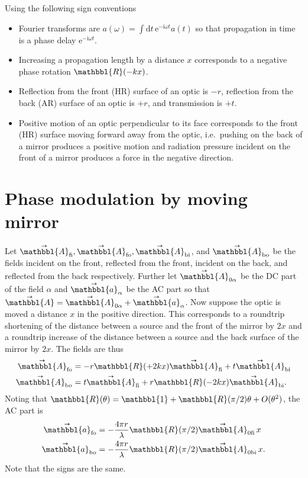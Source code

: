 \documentclass[
  reprint,
  12pt,
  onecolumn,
  nofootinbib,
]{revtex4-2}
\newcommand{\Tmat}[1]{\ensuremath{\mathbbl{#1}}}
\newcommand{\Tvec}[1]{\overset{\raisebox{-2pt}{\text{\tiny$\bm\rightarrow$}}}{\mathbbl{#1}}}
\newcommand{\rme}{\mathrm{e}}
\newcommand{\rmi}{\mathrm{i}}
\newcommand{\rmd}{\mathrm{d}}
\begin{document}
Using the following sign conventions
\begin{itemize}
\item Fourier transforms are
  $a(\omega) = \int \rmd t\, \rme^{-\rmi\omega t} a(t)$
  so that propagation in time is a phase delay $\rme^{-\rmi\omega t}$.
\item Increasing a propagation length by a distance $x$ corresponds to a negative phase rotation $\Tmat{R}(-kx)$.
\item Reflection from the front (HR) surface of an optic is $-r$, reflection from the back (AR) surface of an optic is $+r$, and transmission is $+t$.
\item Positive motion of an optic perpendicular to its face corresponds to the front (HR) surface moving forward away from the optic, i.e.\ pushing on the back of a mirror produces a positive motion and radiation pressure incident on the front of a mirror produces a force in the negative direction.
\end{itemize}

\section{Phase modulation by moving mirror}

Let $\Tvec{A}_{\text{fi}}, \Tvec{A}_{\text{fo}}, \Tvec{A}_{\text{bi}}$, and $\Tvec{A}_{\text{bo}}$ be the fields incident on the front, reflected from the front, incident on the back, and reflected from the back respectively. Further let $\Tvec{A}_{0\alpha}$ be the DC part of the field $\alpha$ and $\Tvec{a}_\alpha$ be the AC part so that $\Tvec{A} = \Tvec{A}_{0\alpha} + \Tvec{a}_\alpha$. Now suppose the optic is moved a distance $x$ in the positive direction. This corresponds to a roundtrip shortening of the distance between a source and the front of the mirror by $2x$ and a roundtrip increase of the distance between a source and the back surface of the mirror by $2x$. The fields are thus
\begin{subequations}
\begin{align}
  \Tvec{A}_\text{fo} &= -r \Tmat{R}(+2kx) \Tvec{A}_\text{fi} + t\Tvec{A}_\text{bi} \\
  \Tvec{A}_\text{bo} &= t\Tvec{A}_\text{fi} + r\Tmat{R}(-2kx) \Tvec{A}_\text{bi}.
\end{align}
\end{subequations}
Noting that $\Tmat{R}(\theta) = \Tmat{1} + \Tmat{R}(\pi/2)\theta + O(\theta^2)$, the AC part is
\begin{subequations}
\begin{align}
  \Tvec{a}_\text{fo} &= - \frac{4\pi r}{\lambda} \Tmat{R}(\pi/2) \Tvec{A}_\text{0fi}\, x \\
  \Tvec{a}_\text{bo} &= - \frac{4\pi r}{\lambda} \Tmat{R}(\pi/2) \Tvec{A}_\text{0bi}\, x.
\end{align}
\end{subequations}
Note that the signs are the same.
\end{document}
